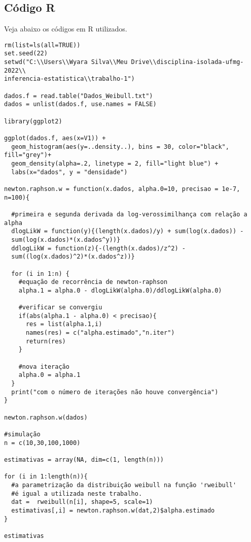 \documentclass[a4paper, 11pt]{article}
\begin{document}
\newpage
\subsection*{Código R}

Veja abaixo os códigos em R utilizados.

\begin{verbatim}
rm(list=ls(all=TRUE))
set.seed(22)
setwd("C:\\Users\\Wyara Silva\\Meu Drive\\disciplina-isolada-ufmg-2022\\
inferencia-estatistica\\trabalho-1")

dados.f = read.table("Dados_Weibull.txt")
dados = unlist(dados.f, use.names = FALSE)

library(ggplot2)

ggplot(dados.f, aes(x=V1)) + 
  geom_histogram(aes(y=..density..), bins = 30, color="black", fill="grey")+
  geom_density(alpha=.2, linetype = 2, fill="light blue") +
  labs(x="dados", y = "densidade")

newton.raphson.w = function(x.dados, alpha.0=10, precisao = 1e-7, n=100){
  
  #primeira e segunda derivada da log-verossimilhança com relação a alpha
  dlogLikW = function(y){(length(x.dados)/y) + sum(log(x.dados)) -
  sum(log(x.dados)*(x.dados^y))}
  ddlogLikW = function(z){-(length(x.dados)/z^2) -
  sum((log(x.dados)^2)*(x.dados^z))}
  
  for (i in 1:n) {
    #equação de recorrência de newton-raphson
    alpha.1 = alpha.0 - dlogLikW(alpha.0)/ddlogLikW(alpha.0)
    
    #verificar se convergiu
    if(abs(alpha.1 - alpha.0) < precisao){
      res = list(alpha.1,i)
      names(res) = c("alpha.estimado","n.iter")
      return(res)
    }
    
    #nova iteração
    alpha.0 = alpha.1
  }
  print("com o número de iterações não houve convergência")
}

newton.raphson.w(dados)

#simulação
n = c(10,30,100,1000)

estimativas = array(NA, dim=c(1, length(n)))

for (i in 1:length(n)){
  #a parametrização da distribuição weibull na função 'rweibull'
  #é igual a utilizada neste trabalho.
  dat =  rweibull(n[i], shape=5, scale=1)
  estimativas[,i] = newton.raphson.w(dat,2)$alpha.estimado
}

estimativas

\end{verbatim}
\end{document}
